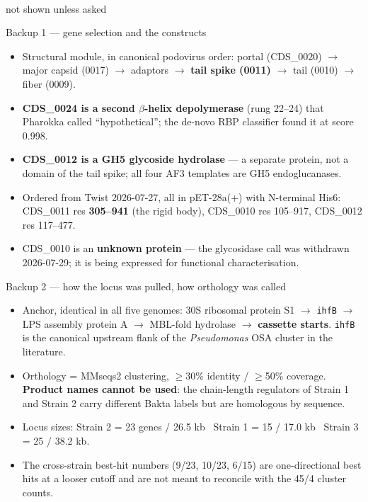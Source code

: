 \documentclass[aspectratio=169,12pt]{beamer}
\begin{document}
\begin{frame}[plain]
  \vspace{1.2cm}\\[4pt]{\color{muted} not shown unless asked}
\end{frame}

\begin{frame}{Backup 1 — gene selection and the constructs}
  \small
  \begin{itemize}\setlength\itemsep{5pt}
    \item Structural module, in canonical podovirus order: portal (CDS\_0020) $\rightarrow$ major
          capsid (0017) $\rightarrow$ adaptors $\rightarrow$ \textbf{tail spike (0011)} $\rightarrow$
          tail (0010) $\rightarrow$ fiber (0009).
    \item \textbf{CDS\_0024 is a second $\beta$-helix depolymerase} (rung 22–24) that Pharokka called
          ``hypothetical''; the de-novo RBP classifier found it at score 0.998.
    \item \textbf{CDS\_0012 is a GH5 glycoside hydrolase} — a separate protein, not a domain of the
          tail spike; all four AF3 templates are GH5 endoglucanases.
    \item Ordered from Twist 2026-07-27, all in pET-28a(+) with N-terminal His6:
          CDS\_0011 res \textbf{305–941} (the rigid body), CDS\_0010 res 105–917,
          CDS\_0012 res 117–477.
    \item CDS\_0010 is an \textbf{unknown protein} — the glycosidase call was withdrawn 2026-07-29;
          it is being expressed for functional characterisation.
  \end{itemize}
\end{frame}

\begin{frame}{Backup 2 — how the locus was pulled, how orthology was called}
  \small
  \begin{itemize}\setlength\itemsep{5pt}
    \item Anchor, identical in all five genomes: 30S ribosomal protein S1 $\rightarrow$ \texttt{ihfB}
          $\rightarrow$ LPS assembly protein A $\rightarrow$ MBL-fold hydrolase $\rightarrow$
          \textbf{cassette starts}. \texttt{ihfB} is the canonical upstream flank of the
          \textit{Pseudomonas} OSA cluster in the literature.
    \item Orthology = MMseqs2 clustering, $\geq$30\% identity / $\geq$50\% coverage.
          \textbf{Product names cannot be used}: the chain-length regulators of Strain 1 and Strain 2
          carry different Bakta labels but are homologous by sequence.
    \item Locus sizes: Strain 2 = 23 genes / 26.5 kb \textbullet\ Strain 1 = 15 / 17.0 kb \textbullet\
          Strain 3 = 25 / 38.2 kb.
    \item The cross-strain best-hit numbers (9/23, 10/23, 6/15) are one-directional best hits at a
          looser cutoff and are not meant to reconcile with the 45/4 cluster counts.
  \end{itemize}
\end{frame}
\end{document}
